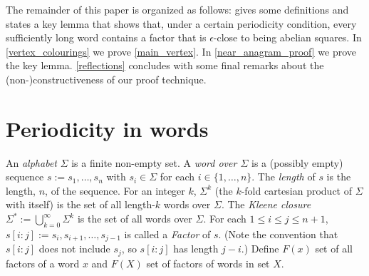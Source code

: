 \documentclass{patmorin}
\begin{document}
%
%



The remainder of this paper is organized as follows:  gives some definitions and states a key lemma that shows that, under a certain periodicity condition, every sufficiently long word contains a factor that is $\epsilon$-close to being abelian squares.
In \cref{vertex_colourings} we prove \cref{main_vertex}.  In \cref{near_anagram_proof} we prove the key lemma. \cref{reflections} concludes with some final remarks about the (non-)constructiveness of our proof technique.

\section{Periodicity in words}
\label{near_anagram_statement}

An \emph{alphabet} $\Sigma$ is a finite non-empty set.  A \emph{word over $\Sigma$} is a (possibly empty) sequence $s:=s_1,\ldots,s_n$ with $s_i\in\Sigma$ for each $i\in\{1,\ldots,n\}$. The \emph{length} of $s$ is the length, $n$, of the sequence. For an integer $k$, $\Sigma^k$ (the $k$-fold cartesian product of $\Sigma$ with itself) is the set of all length-$k$ words over $\Sigma$.  The \emph{Kleene closure} $\Sigma^*:=\bigcup_{k=0}^\infty \Sigma^k$ is the set of all words over $\Sigma$.  For each $1 \le i \le j\le n+1$, $s[i\mathbin{:}j]:=s_i,s_{i+1},\ldots,s_{j-1}$ is called a \emph{Factor} of $s$. (Note the convention that $s[i\mathbin{:}j]$ does not include $s_j$, so $s[i\mathbin{:}j]$ has length $j-i$.) Define $F(x)$ set of all factors of a word $x$ and $F(X)$ set of factors of words in set $X$.
\end{document}
